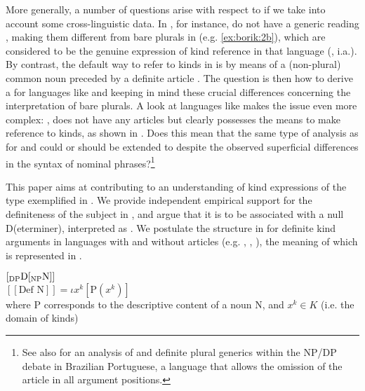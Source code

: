 \documentclass[output=paper
,modfonts
,nonflat]{langsci/langscibook}
\begin{document}
	More generally, a number of questions arise with respect to  if we take into account some cross-linguistic data. In , for instance,  do not have a generic reading \citep{Laca1990,Dobrovie-Sorin1996, Dobrovie-Sorin2003}, making them different from bare plurals in  (e.g. \ref{ex:borik:2b}), which are considered to be the genuine expression of kind reference in that language (\citealt{Longobardi1994, Longobardi2001, Longobardi2005,Chierchia1998,Dayal2004}, i.a.). By contrast, the default way to refer to kinds in  is by means of a (non-plural) common noun preceded by a definite article \citep{Borik2015}. The question is then how to derive a  for languages like  and  keeping in mind these crucial differences concerning the interpretation of bare plurals. A look at languages like  makes the issue even more complex: , does not have any articles but clearly possesses the means to make reference to kinds, as shown in . Does this mean that the same type of analysis as for  and  could or should be extended to  despite the observed superficial differences in the syntax of nominal phrases?\footnote{See also \citet{Cyrino2015} for an analysis of  and definite plural generics within the NP/DP debate in Brazilian Portuguese, a language that allows the omission of the article in all argument positions.}
	
	This paper aims at contributing to an understanding of kind expressions of the type exemplified in . We provide independent empirical support for the definiteness of the subject in , and argue that it is to be associated with a null D(eterminer), interpreted as . We postulate the structure in  for definite kind arguments in languages with and without articles (e.g. , , ), the meaning of which is represented in . 
	
	\ea\label{ex:borik:3}
	\ea\label{ex:borik:3a}
	$[_{\mbox{\scriptsize DP}} \mbox{D} [_{\mbox{\scriptsize NP}} \mbox{N}]]$\\
	\ex\label{ex:borik:3b}
	$[\![ \mbox{Def N} ]\!] = \iota x^k [\mbox{P}(x^k)]$\\
	where P corresponds to the descriptive content of a noun N, and $x^k \in K$ (i.e. the domain of kinds)
	\z
	\z
	
\end{document}
